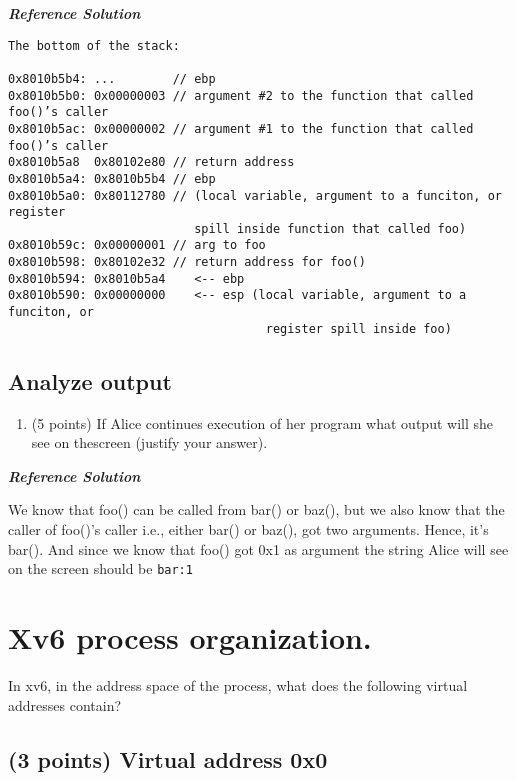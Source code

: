 \documentclass[]{article}
\providecommand{\tightlist}{%
  \setlength{\itemsep}{0pt}\setlength{\parskip}{0pt}}
\begin{document}
\textbf{\emph{Reference Solution}}

\begin{verbatim}
The bottom of the stack:

0x8010b5b4: ...        // ebp
0x8010b5b0: 0x00000003 // argument #2 to the function that called foo()’s caller
0x8010b5ac: 0x00000002 // argument #1 to the function that called foo()’s caller
0x8010b5a8  0x80102e80 // return address
0x8010b5a4: 0x8010b5b4 // ebp
0x8010b5a0: 0x80112780 // (local variable, argument to a funciton, or register
                          spill inside function that called foo)
0x8010b59c: 0x00000001 // arg to foo
0x8010b598: 0x80102e32 // return address for foo()
0x8010b594: 0x8010b5a4    <-- ebp
0x8010b590: 0x00000000    <-- esp (local variable, argument to a funciton, or 
                                    register spill inside foo)
\end{verbatim}

\hypertarget{analyze-output}{%
\subsection{Analyze output}\label{analyze-output}}

\begin{enumerate}
\def\labelenumi{(\alph{enumi})}
\setcounter{enumi}{1}
\tightlist
\item
  (5 points) If Alice continues execution of her program what output
  will she see on thescreen (justify your answer).
\end{enumerate}

\textbf{\emph{Reference Solution}}

We know that foo() can be called from bar() or baz(), but we also know
that the caller of foo()'s caller i.e., either bar() or baz(), got two
arguments. Hence, it's bar(). And since we know that foo() got 0x1 as
argument the string Alice will see on the screen should be
\texttt{bar:1}

\hypertarget{xv6-process-organization.}{%
\section{Xv6 process organization.}\label{xv6-process-organization.}}

In xv6, in the address space of the process, what does the following
virtual addresses contain?

\hypertarget{points-virtual-address-0x0}{%
\subsection{(3 points) Virtual address
0x0}\label{points-virtual-address-0x0}}
\end{document}
